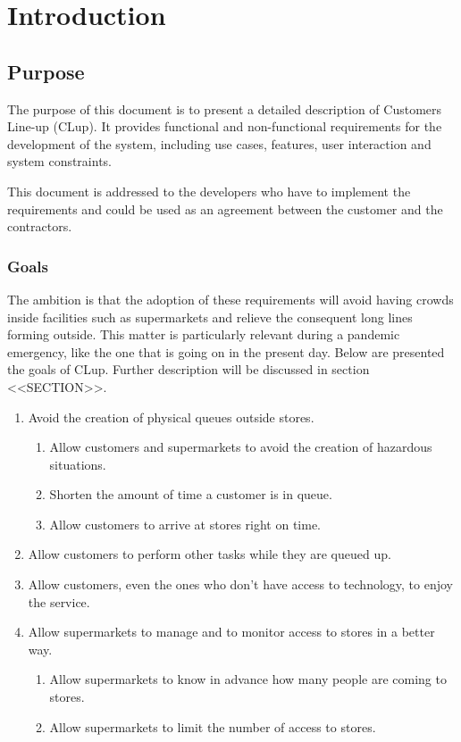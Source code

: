 \chapter{Introduction}

\section{Purpose}
The purpose of this document is to present a detailed description of Customers Line-up (CLup).
It provides functional and non-functional requirements for the development of the system, including use cases, features, user interaction and system constraints.

This document is addressed to the developers who have to implement the requirements and could be used as an agreement between the customer and the contractors.

\subsection{Goals}
The ambition is that the adoption of these requirements will avoid having crowds inside facilities such as supermarkets and relieve the consequent long lines forming outside. This matter is particularly relevant during a pandemic emergency, like the one that is going on in the present day.\newline
Below are presented the goals of CLup. Further description will be discussed in section <<SECTION>>.

\begin{enumerate}[label=\textbf{G.\arabic*}]
	\item Avoid the creation of physical queues outside stores.
	\begin{enumerate}[label*=\textbf{.\arabic*}, leftmargin=+.5in]
		\item Allow customers and supermarkets to avoid the creation of hazardous situations.
		\item Shorten the amount of time a customer is in queue.
		\item Allow customers to arrive at stores right on time.
	\end{enumerate}

	\item Allow customers to perform other tasks while they are queued up.

	\item Allow customers, even the ones who don't have access to technology, to enjoy the service.

	\item Allow supermarkets to manage and to monitor access to stores in a better way.
	\begin{enumerate}[label*=\textbf{.\arabic*}, leftmargin=+.5in]
		\item Allow supermarkets to know in advance how many people are coming to stores.
		\item Allow supermarkets to limit the number of access to stores.
	\end{enumerate}
\end{enumerate}

